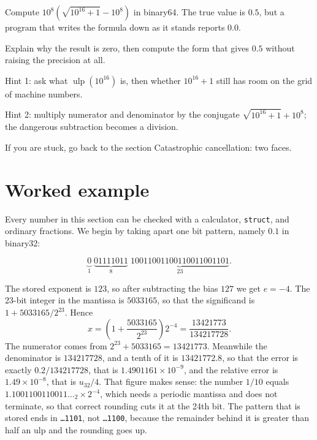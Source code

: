 \pagebreak[4]
\begin{tantangan}
Compute $10^{8}\left(\sqrt{10^{16}+1}-10^{8}\right)$ in binary64. The true value is
$0.5$, but a program that writes the formula down as it stands reports $0.0$.

Explain why the result is zero, then compute the form that gives $0.5$ without raising
the precision at all.

Hint 1: ask what $\operatorname{ulp}(10^{16})$ is, then whether $10^{16}+1$
still has room on the grid of machine numbers.

Hint 2: multiply numerator and denominator by the conjugate
$\sqrt{10^{16}+1}+10^{8}$; the dangerous subtraction becomes a division.

If you are stuck, go back to the section Catastrophic cancellation: two faces.
\end{tantangan}

\section{Worked example}

Every number in this section can be checked with a calculator, \texttt{struct}, and
ordinary fractions. We begin by taking apart one bit pattern, namely $0.1$ in binary32:

\[
  \underbrace{0}_{1}\;\underbrace{01111011}_{8}\;
  \underbrace{10011001100110011001101}_{23}.
\]

The stored exponent is $123$, so after subtracting the bias $127$ we get $e=-4$. The
23-bit integer in the mantissa is $5033165$, so that the significand is
$1+5033165/2^{23}$. Hence
\[
  x=\left(1+\frac{5033165}{2^{23}}\right)2^{-4}=\frac{13421773}{134217728}.
\]
The numerator comes from $2^{23}+5033165=13421773$. Meanwhile the denominator is
$134217728$, and a tenth of it is $13421772.8$, so that the error is exactly
$0.2/134217728$, that is $1.4901161\times10^{-9}$,
and the relative error is $1.49\times10^{-8}$, that is $u_{32}/4$. That figure makes
sense: the number $1/10$ equals $1.1001100110011\dots_{2}\times2^{-4}$, which needs a
periodic mantissa and does not terminate, so that correct rounding cuts it at the 24th
bit. The pattern that is stored
ends in \texttt{\dots 1101}, not \texttt{\dots 1100}, because the remainder behind it is
greater than half an ulp and the rounding goes up.



